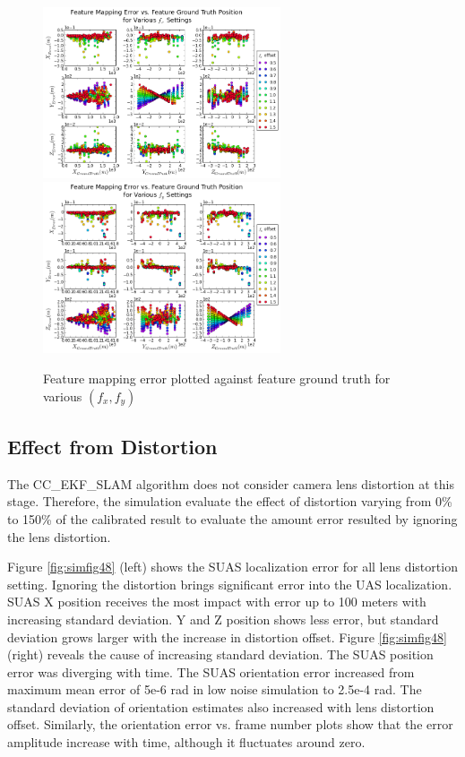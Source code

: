 \begin{figure}[h]
  \centering
  \includegraphics[width=7cm,keepaspectratio=true]{./Figures/SimulationFigures/Figure41.png}
  \includegraphics[width=7cm,keepaspectratio=true]{./Figures/SimulationFigures/Figure42.png}
  \caption{Feature mapping error plotted against feature ground truth
    for various $(f_x, f_y)$}
  \label{fig:simfig38-39}
\end{figure}

\FloatBarrier

\subsection{Effect from Distortion}

The CC\_EKF\_SLAM algorithm does not consider camera lens distortion
at this stage. Therefore, the simulation evaluate the effect of
distortion varying from 0\% to 150\% of the calibrated result to
evaluate the amount error resulted by ignoring the lens distortion. 

Figure \ref{fig:simfig48} (left) shows the SUAS localization error for
all lens distortion setting. Ignoring the distortion brings
significant error into the UAS localization. SUAS X position receives
the most impact with error up to 100 meters with increasing standard
deviation. Y and Z position shows less error, but standard deviation
grows larger with the increase in distortion offset. Figure
\ref{fig:simfig48} (right) reveals the cause of increasing standard
deviation. The SUAS position error was diverging with time. The SUAS
orientation error increased from maximum mean error of 5e-6 rad in low
noise simulation to 2.5e-4 rad. The standard deviation of orientation
estimates also increased with lens distortion offset. Similarly, the
orientation error vs. frame number plots show that the error amplitude
increase with time, although it fluctuates around zero.

